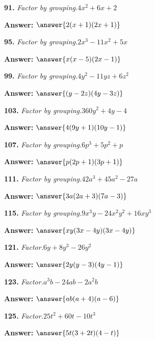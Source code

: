 \documentclass{ximera}
\begin{document}
\begin{problem}
\textbf{91.} \emph{Factor by grouping.}\quad $4x^2 + 6x + 2$

\textbf{Answer:} $\answer{2(x +1)(2x +1)}$
\end{problem}

\begin{problem}
\textbf{95.} \emph{Factor by grouping.}\quad $2x^3 - 11x^2 + 5x$

\textbf{Answer:} $\answer{x(x -5)(2x -1)}$
\end{problem}

\begin{problem}
\textbf{99.} \emph{Factor by grouping.}\quad $4y^2 - 11yz + 6z^2$

\textbf{Answer:} $\answer{(y -2z)(4y -3z)}$
\end{problem}

\begin{problem}
\textbf{103.} \emph{Factor by grouping.}\quad $360y^2 + 4y - 4$

\textbf{Answer:} $\answer{4(9y +1)(10y -1)}$
\end{problem}

\begin{problem}
\textbf{107.} \emph{Factor by grouping.}\quad $6p^3 + 5p^2 + p$

\textbf{Answer:} $\answer{p(2p +1)(3p +1)}$
\end{problem}

\begin{problem}
\textbf{111.} \emph{Factor by grouping.}\quad $42a^3 + 45a^2 - 27a$

\textbf{Answer:} $\answer{3a(2a +3)(7a -3)}$
\end{problem}

\begin{problem}
\textbf{115.} \emph{Factor by grouping.}\quad $9x^3y - 24x^2y^2 + 16xy^3$

\textbf{Answer:} $\answer{xy(3x -4y)(3x -4y)}$
\end{problem}

\begin{problem}
\textbf{121.} \emph{Factor.}\quad $6y + 8y^3 - 26y^2$

\textbf{Answer:} $\answer{2y(y -3)(4y -1)}$
\end{problem}

\begin{problem}
\textbf{123.} \emph{Factor.}\quad $a^3b - 24ab - 2a^2b$

\textbf{Answer:} $\answer{ab(a +4)(a -6)}$
\end{problem}

\begin{problem}
\textbf{125.} \emph{Factor.}\quad $25t^2 + 60t - 10t^3$

\textbf{Answer:} $\answer{5t(3 +2t)(4 -t)}$
\end{problem}
\end{document}

